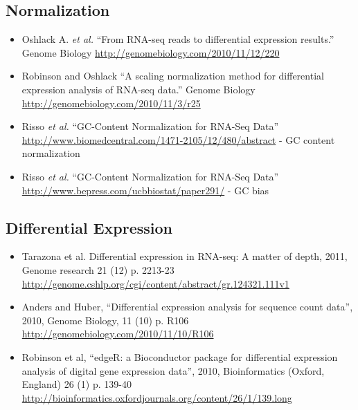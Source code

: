 \documentclass[a4paper,11pt,english]{sphinxmanual}
\begin{document}
\subsection{Normalization}
\label{ReadingList:normalization}\begin{itemize}
\item {} 
Oshlack A. \emph{et al.} ``From RNA-seq reads to differential expression results.'' Genome Biology \href{http://genomebiology.com/2010/11/12/220}{http://genomebiology.com/2010/11/12/220}

\item {} 
Robinson and Oshlack ``A scaling normalization method for differential expression analysis of RNA-seq data.'' Genome Biology \href{http://genomebiology.com/2010/11/3/r25}{http://genomebiology.com/2010/11/3/r25}

\item {} 
Risso \emph{et al.} ``GC-Content Normalization for RNA-Seq Data'' \href{http://www.biomedcentral.com/1471-2105/12/480/abstract}{http://www.biomedcentral.com/1471-2105/12/480/abstract} - GC content normalization

\item {} 
Risso \emph{et al.} ``GC-Content Normalization for RNA-Seq Data'' \href{http://www.bepress.com/ucbbiostat/paper291/}{http://www.bepress.com/ucbbiostat/paper291/} - GC bias

\end{itemize}


\subsection{Differential Expression}
\label{ReadingList:differential-expression}\begin{itemize}
\item {} 
Tarazona et al. Differential expression in RNA-seq: A matter of depth, 2011,
Genome research 21 (12) p. 2213-23
\href{http://genome.cshlp.org/cgi/content/abstract/gr.124321.111v1}{http://genome.cshlp.org/cgi/content/abstract/gr.124321.111v1}

\item {} 
Anders and Huber, ``Differential expression analysis for sequence count data'', 2010, Genome Biology, 11 (10) p. R106
\href{http://genomebiology.com/2010/11/10/R106}{http://genomebiology.com/2010/11/10/R106}

\item {} 
Robinson et al, ``edgeR: a Bioconductor package for differential expression analysis of digital gene expression data'', 2010, Bioinformatics (Oxford, England) 26 (1) p. 139-40
\href{http://bioinformatics.oxfordjournals.org/content/26/1/139.long}{http://bioinformatics.oxfordjournals.org/content/26/1/139.long}

\end{itemize}
\end{document}
